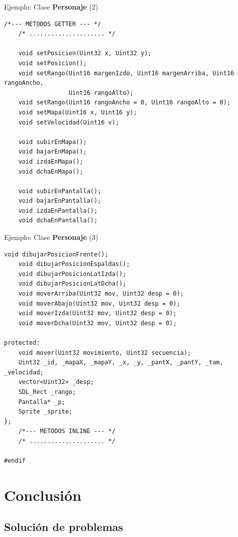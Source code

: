 \documentclass[9pt,xcolor=svgnames]{beamer}
\begin{document}
  \begin{frame}[fragile=singleslide]{Ejemplo: Clase \textbf{Personaje} (2)}
   
   \begin{lstlisting}[style=C++]
    /*--- METODOS GETTER --- */
    /* ..................... */

    void setPosicion(Uint32 x, Uint32 y);
    void setPosicion();
    void setRango(Uint16 margenIzdo, Uint16 margenArriba, Uint16 rangoAncho,
                  Uint16 rangoAlto);
    void setRango(Uint16 rangoAncho = 0, Uint16 rangoAlto = 0);
    void setMapa(Uint16 x, Uint16 y);
    void setVelocidad(Uint16 v);

    void subirEnMapa();
    void bajarEnMapa();
    void izdaEnMapa();
    void dchaEnMapa();

    void subirEnPantalla();
    void bajarEnPantalla();
    void izdaEnPantalla();
    void dchaEnPantalla();
   \end{lstlisting}
  \end{frame}

  \begin{frame}[fragile=singleslide]{Ejemplo: Clase \textbf{Personaje} (3)}
   
   \begin{lstlisting}[style=C++]
    void dibujarPosicionFrente();
    void dibujarPosicionEspaldas();
    void dibujarPosicionLatIzda();
    void dibujarPosicionLatDcha();    
    void moverArriba(Uint32 mov, Uint32 desp = 0);
    void moverAbajo(Uint32 mov, Uint32 desp = 0);
    void moverIzda(Uint32 mov, Uint32 desp = 0);
    void moverDcha(Uint32 mov, Uint32 desp = 0);

protected:
    void mover(Uint32 movimiento, Uint32 secuencia);
    Uint32 _id, _mapaX, _mapaY, _x, _y, _pantX, _pantY, _tam, _velocidad;
    vector<Uint32> _desp;
    SDL_Rect _rango;
    Pantalla* _p;
    Sprite _sprite;
};
    /*--- METODOS INLINE --- */
    /* ..................... */

#endif
   \end{lstlisting}
  \end{frame}
    
  


 \section{Conclusión}
 
  \subsection{Solución de problemas}
\end{document}
